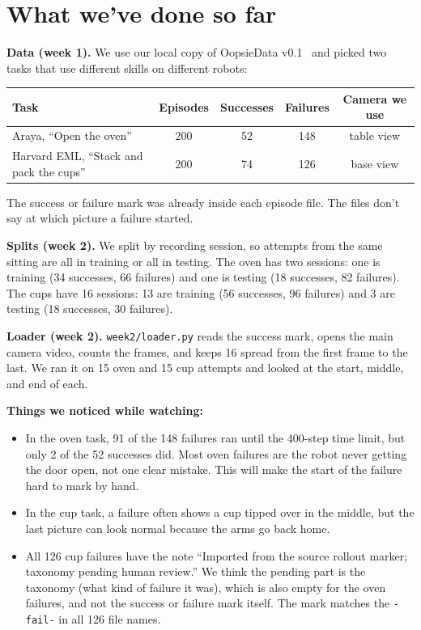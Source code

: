 \documentclass{article}
\begin{document}
\section{What we've done so far}\label{sec:done}
\textbf{Data (week 1).} We use our local copy of OopsieData v0.1~\citep{oopsiedata} and picked two tasks that use different skills on different robots:

\begin{center}
\begin{tabular}{lcccc}
\hline
Task & Episodes & Successes & Failures & Camera we use \\
\hline
Araya, ``Open the oven'' & 200 & 52 & 148 & table view \\
Harvard EML, ``Stack and pack the cups'' & 200 & 74 & 126 & base view \\
\hline
\end{tabular}
\end{center}

The success or failure mark was already inside each episode file. The files don't say at which picture a failure started.

\textbf{Splits (week 2).} We split by recording session, so attempts from the same sitting are all in training or all in testing. The oven has two sessions: one is training (34 successes, 66 failures) and one is testing (18 successes, 82 failures). The cups have 16 sessions: 13 are training (56 successes, 96 failures) and 3 are testing (18 successes, 30 failures).

\textbf{Loader (week 2).} \texttt{week2/loader.py} reads the success mark, opens the main camera video, counts the frames, and keeps 16 spread from the first frame to the last. We ran it on 15 oven and 15 cup attempts and looked at the start, middle, and end of each.

\textbf{Things we noticed while watching:}
\begin{itemize}
\item In the oven task, 91 of the 148 failures ran until the 400-step time limit, but only 2 of the 52 successes did. Most oven failures are the robot never getting the door open, not one clear mistake. This will make the start of the failure hard to mark by hand.
\item In the cup task, a failure often shows a cup tipped over in the middle, but the last picture can look normal because the arms go back home.
\item All 126 cup failures have the note ``Imported from the source rollout marker; taxonomy pending human review.'' We think the pending part is the taxonomy (what kind of failure it was), which is also empty for the oven failures, and not the success or failure mark itself. The mark matches the \texttt{-fail-} in all 126 file names.
\end{itemize}
\end{document}
